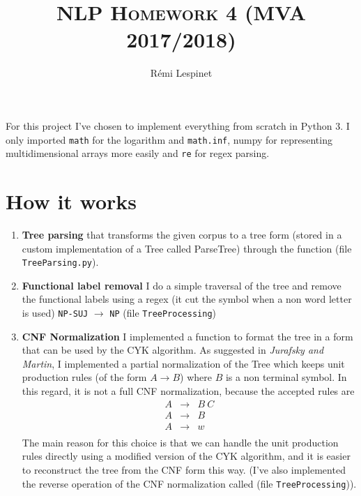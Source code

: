 \documentclass[a4paper, 11pt]{article}
\title{\textsc{NLP Homework 4 (MVA 2017/2018)}\vspace{-2ex}}
\author{Rémi Lespinet\vspace{-2ex}}
\date{}
\newcommand{\itemi}[1]{\item{\textbf{#1}}}
\begin{document}
\maketitle
\thispagestyle{fancy}

For this project I've chosen to implement everything from scratch in
Python 3. I only imported \verb+math+ for the logarithm and
\verb+math.inf+, numpy for representing multidimensional arrays more
easily and \verb+re+ for regex parsing. %
\section{How it works}
\begin{enumerate}
  \itemi{Tree parsing} that transforms the given corpus to a tree form
  (stored in a custom implementation of a Tree called ParseTree)
  through the function (file \verb+TreeParsing.py+).

  \itemi{Functional label removal} I do a simple traversal of the tree
  and remove the functional labels using a regex (it cut the symbol
  when a non word letter is used)
  \verb+NP-SUJ+ $\to$ \verb+NP+ (file \verb+TreeProcessing+)

  \itemi{CNF Normalization} I implemented a function to format the
  tree in a form that can be used by the CYK algorithm. As suggested
  in \emph{Jurafsky and Martin}, I implemented a partial normalization of the
  Tree which keeps unit production rules (of the form $A \to B$) where
  $B$ is a non terminal symbol. In this regard, it is not a full CNF
  normalization, because the accepted rules are
  \begin{displaymath}
    \begin{array}{lcl}
      A & \to & B\ C \\
      A & \to & B \\
      A & \to & w \\
    \end{array}
  \end{displaymath}
  The main reason for this choice is that we can handle the unit
  production rules directly using a modified version of the CYK
  algorithm, and it is easier to reconstruct the tree from the CNF
  form this way. (I've also implemented the reverse operation of the
  CNF normalization called (file \verb+TreeProcessing+)).


\end{enumerate}
\end{document}
